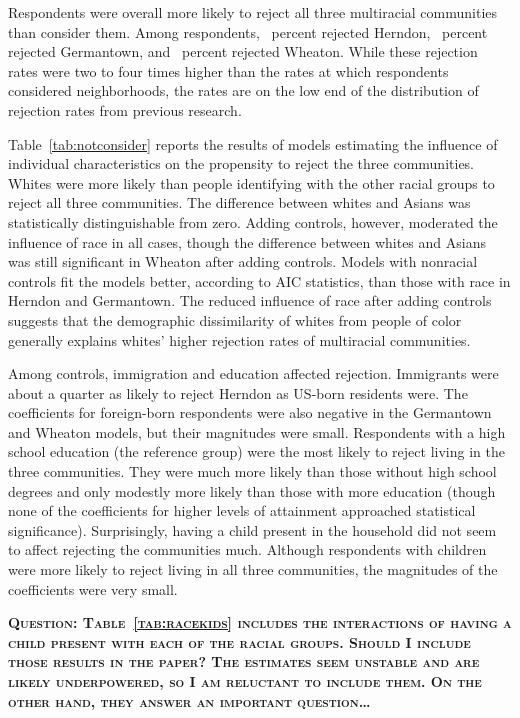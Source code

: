 \documentclass{baderart}
\begin{document}
Respondents were overall more likely to reject all three multiracial communities than consider them. Among respondents, \ncherndon~percent rejected Herndon, \ncgermantown~percent rejected Germantown, and \ncwheaton~percent rejected Wheaton. While these rejection rates were two to four times higher than the rates at which respondents considered neighborhoods, the rates are on the low end of the distribution of rejection rates from previous research. 

Table~\ref{tab:notconsider} reports the results of models estimating the influence of individual characteristics on the propensity to reject the three communities. Whites were more likely than people identifying with the other racial groups to reject all three communities. The difference between whites and Asians was statistically distinguishable from zero. Adding controls, however, moderated the influence of race in all cases, though the difference between whites and Asians was still significant in Wheaton after adding controls. Models with nonracial controls fit the models better, according to AIC statistics, than those with race in Herndon and Germantown. The reduced influence of race after adding controls suggests that the demographic dissimilarity of whites from people of color generally explains whites' higher rejection rates of multiracial communities. 


Among controls, immigration and education affected rejection. Immigrants were about a quarter as likely to reject Herndon as US-born residents were. The coefficients for foreign-born respondents were also negative in the Germantown and Wheaton models, but their magnitudes were small. Respondents with a high school education (the reference group) were the most likely to reject living in the three communities. They were much more likely than those without high school degrees and only modestly more likely than those with more education (though none of the coefficients for higher levels of attainment approached statistical significance). Surprisingly, having a child present in the household did not seem to affect rejecting the communities much. Although respondents with children were more likely to reject living in all three communities, the magnitudes of the coefficients were very small.  

\textbf{\textsc{Question: Table~\ref{tab:racekids} includes the interactions of having a child present with each of the racial groups. Should I include those results in the paper? The estimates seem unstable and are likely underpowered, so I am reluctant to include them. On the other hand, they answer an important question\ldots }}
\end{document}
